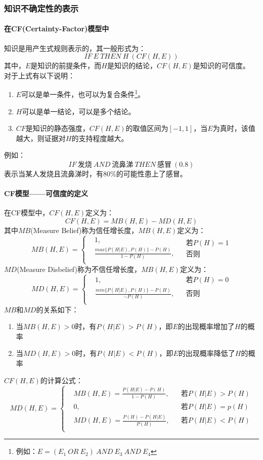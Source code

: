 \documentclass[12pt]{article}
\begin{document}
\subsubsection{知识不确定性的表示}
\paragraph{在CF(Certainty-Factor)模型中}知识是用产生式规则表示的，其一般形式为：
$$IF\ E\ THEN\ H\ (CF(H,E))$$
其中，$E$是知识的前提条件，而$H$是知识的结论，$CF(H,E)$是知识的可信度。\\
对于上式有以下说明：
\begin{enumerate}
	\item{$E$可以是单一条件，也可以为复合条件\footnote{例如：$E=(E_1\ OR\ E_2)\ AND\ E_3\ AND\ E_4$}。}
	\item{$H$可以是单一结论，可以是多个结论。}
	\item{$CF$是知识的静态强度，$CF(H,E)$的取值区间为$[-1,1]$，当$E$为真时，该值越大，则证据对$H$的支持程度越大。}
\end{enumerate}
例如：$$IF\ 发烧\ AND\ 流鼻涕\ THEN\ 感冒\ (0.8)$$ 表示当某人发烧且流鼻涕时，有80\%的可能性患上了感冒。
\paragraph{CF模型——可信度的定义}
在CF模型中，$CF(H,E)$定义为：
$$CF(H,E)=MB(H,E)-MD(H,E)$$
其中$MB$(Measure Belief)称为信任增长度，$MB(H,E)$定义为：
$$MB(H,E)=\left\{
	\begin{aligned}
		&1,\\
		&\frac{max\{P(H|E),P(H)\}-P(H)}{1-P(H)},\\
	\end{aligned}
	\begin{aligned}
		&若P(H)=1\\
		&否则\\
	\end{aligned}
\right.$$
$MD$(Measure Disbelief)称为不信任增长度，$MB(H,E)$定义为：
$$MD(H,E)=\left\{
	\begin{aligned}
		&1,&&若P(H)=0\\
		&\frac{min\{P(H|E),P(H)\}-P(H)}{-P(H)},&&否则\\
	\end{aligned}
\right.$$
$MB$和$MD$的关系如下：
\begin{enumerate}
	\item{当$MB(H,E)>0$时，有$P(H|E)>P(H)$，即$E$的出现概率增加了$H$的概率}
	\item{当$MD(H,E)>0$时，有$P(H|E)<P(H)$，即$E$的出现概率降低了$H$的概率}
\end{enumerate}
$CF(H,E)$的计算公式：
$$MD(H,E)=\left\{
	\begin{aligned}
		&MB(H,E)=\frac{P(H|E)-P(H)}{1-P(H)},&&若P(H|E)>P(H)\\
		&0,&&若P(H|E)=p(H)\\
		&MD(H,E)=\frac{P(H)-P(H|E)}{P(H)},&&若P(H|E)<P(H)\\
	\end{aligned}
\right.$$
\end{document}
